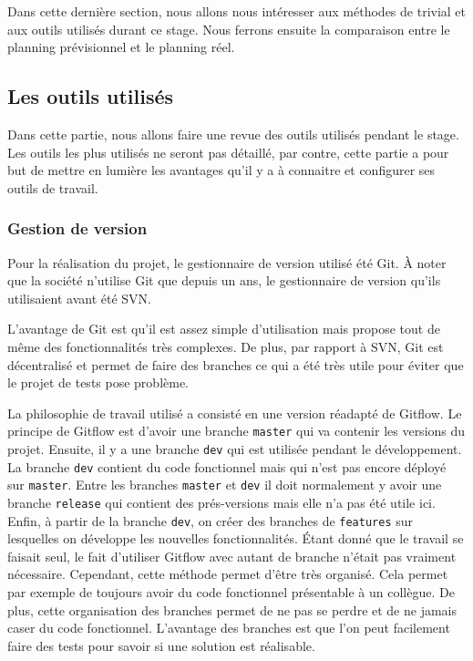 \documentclass[a4paper]{article}
\begin{document}
Dans cette dernière section, nous allons nous intéresser aux méthodes de
trivial et aux outils utilisés durant ce stage. Nous ferrons ensuite la
comparaison entre le planning prévisionnel et le planning réel.

\subsection{Les outils utilisés}%

Dans cette partie, nous allons faire une revue des outils utilisés pendant le
stage. Les outils les plus utilisés ne seront pas détaillé, par contre, cette
partie a pour but de mettre en lumière les avantages qu'il y a à connaitre et
configurer ses outils de travail.

\subsubsection{Gestion de version}%

Pour la réalisation du projet, le gestionnaire de version utilisé été Git. À
noter que la société n'utilise Git que depuis un ans, le gestionnaire de version
qu'ils utilisaient avant été SVN.

L'avantage de Git est qu'il est assez simple d'utilisation mais propose tout de
même des fonctionnalités très complexes. De plus, par rapport à SVN, Git est
décentralisé et permet de faire des branches ce qui a été très utile pour éviter
que le projet de tests pose problème.

La philosophie de travail utilisé a consisté en une version réadapté de Gitflow.
Le principe de Gitflow est d'avoir une branche \verb|master| qui va
contenir les versions du projet. Ensuite, il y a une branche \verb|dev| qui
est utilisée pendant le développement. La branche \verb|dev| contient du
code fonctionnel mais qui n'est pas encore déployé sur \verb|master|. Entre
les branches \verb|master| et \verb|dev| il doit normalement y avoir
une branche \verb|release| qui contient des prés-versions mais elle n'a pas
été utile ici. Enfin, à partir de la branche \verb|dev|, on créer des
branches de \verb|features| sur lesquelles on développe les nouvelles
fonctionnalités. Étant donné que le travail se faisait seul, le fait d'utiliser
Gitflow avec autant de branche n'était pas vraiment nécessaire. Cependant, cette
méthode permet d'être très organisé. Cela permet par exemple de toujours avoir
du code fonctionnel présentable à un collègue. De plus, cette organisation des
branches permet de ne pas se perdre et de ne jamais caser du code fonctionnel.
L'avantage des branches est que l'on peut facilement faire des tests pour savoir
si une solution est réalisable.
\end{document}
